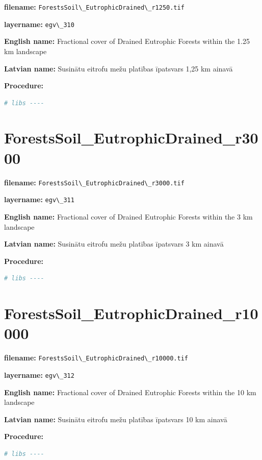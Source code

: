 \documentclass[
]{book}
\newcommand{\passthrough}[1]{#1}
\begin{document}
\textbf{filename:} \passthrough{\lstinline!ForestsSoil\_EutrophicDrained\_r1250.tif!}

\textbf{layername:} \passthrough{\lstinline!egv\_310!}

\textbf{English name:} Fractional cover of Drained Eutrophic Forests within the 1.25 km landscape

\textbf{Latvian name:} Susinātu eitrofu mežu platības īpatsvars 1,25 km ainavā

\textbf{Procedure:}

\begin{lstlisting}[language=R]
# libs ----
\end{lstlisting}

\section{ForestsSoil\_EutrophicDrained\_r3000}\label{ch06.311}

\textbf{filename:} \passthrough{\lstinline!ForestsSoil\_EutrophicDrained\_r3000.tif!}

\textbf{layername:} \passthrough{\lstinline!egv\_311!}

\textbf{English name:} Fractional cover of Drained Eutrophic Forests within the 3 km landscape

\textbf{Latvian name:} Susinātu eitrofu mežu platības īpatsvars 3 km ainavā

\textbf{Procedure:}

\begin{lstlisting}[language=R]
# libs ----
\end{lstlisting}

\section{ForestsSoil\_EutrophicDrained\_r10000}\label{ch06.312}

\textbf{filename:} \passthrough{\lstinline!ForestsSoil\_EutrophicDrained\_r10000.tif!}

\textbf{layername:} \passthrough{\lstinline!egv\_312!}

\textbf{English name:} Fractional cover of Drained Eutrophic Forests within the 10 km landscape

\textbf{Latvian name:} Susinātu eitrofu mežu platības īpatsvars 10 km ainavā

\textbf{Procedure:}

\begin{lstlisting}[language=R]
# libs ----
\end{lstlisting}
\end{document}
